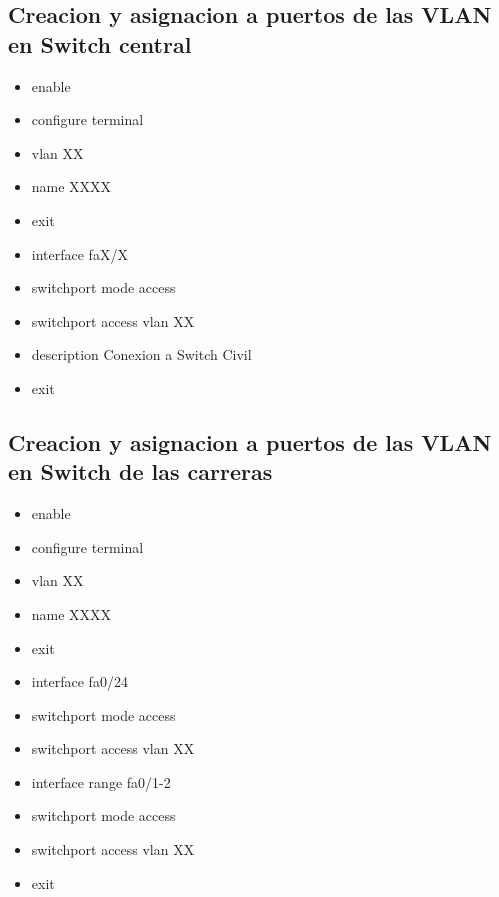 \documentclass[a4paper,16pt]{article}
\begin{document}
	\subsection*{Creacion y asignacion a puertos de las VLAN en Switch central}
	\begin{itemize}
		\item enable
		\item configure terminal
		\item vlan XX
		\item name XXXX
		\item exit
		\item interface faX/X
		\item switchport mode access
		\item switchport access vlan XX
		\item description Conexion a Switch Civil
		\item exit
	\end{itemize}

	\vspace{1cm}
	
	\subsection*{Creacion y asignacion a puertos de las VLAN en Switch de las carreras}
	\begin{itemize}
		\item enable
		\item configure terminal
		\item vlan XX
		\item name XXXX
		\item exit
		\item interface fa0/24
		\item switchport mode access
		\item switchport access vlan XX
		\item interface range fa0/1-2
		\item switchport mode access
		\item switchport access vlan XX
		\item exit
	\end{itemize}
	
	\vspace{1cm}
	
\end{document}
